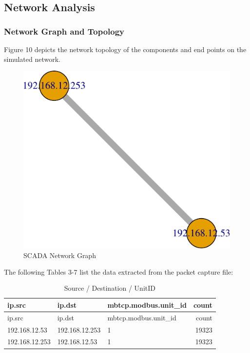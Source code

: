 \documentclass[11pt,a4paper]{article}
\begin{document}
\subsection{Network Analysis}\label{network-analysis}

\subsubsection{Network Graph and
Topology}\label{network-graph-and-topology}

Figure 10 depicts the network topology of the components and end points
on the simulated network.

\begin{figure}[h]

{\centering \includegraphics{thesis_files/figure-latex/warning-1} 

}

\caption{SCADA Network Graph}\label{fig:warning}
\end{figure}

\newpage

The following Tables 3-7 list the data extracted from the packet capture
file:

\begin{longtable}[c]{@{}lllr@{}}
\caption{Source / Destination / UnitID}\tabularnewline
\toprule
ip.src & ip.dst & mbtcp.modbus.unit\_id & count\tabularnewline
\midrule
\endfirsthead
\toprule
ip.src & ip.dst & mbtcp.modbus.unit\_id & count\tabularnewline
\midrule
\endhead
192.168.12.53 & 192.168.12.253 & 1 & 19323\tabularnewline
192.168.12.253 & 192.168.12.53 & 1 & 19323\tabularnewline
\bottomrule
\end{longtable}
\end{document}
